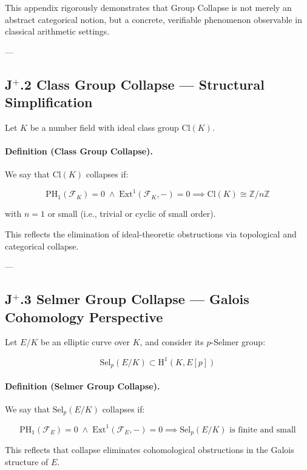 \documentclass[11pt]{article}
\begin{document}
This appendix rigorously demonstrates that Group Collapse is not merely an abstract categorical notion, but a concrete, verifiable phenomenon observable in classical arithmetic settings.

---

\subsection*{J$^{+}$.2 Class Group Collapse — Structural Simplification}

Let $K$ be a number field with ideal class group $\mathrm{Cl}(K)$.

\paragraph{Definition (Class Group Collapse).}

We say that $\mathrm{Cl}(K)$ collapses if:

\[
\mathrm{PH}_1(\mathcal{F}_K) = 0 \;\land\; \mathrm{Ext}^1(\mathcal{F}_K, -) = 0 \implies \mathrm{Cl}(K) \cong \mathbb{Z}/n\mathbb{Z}
\]

with $n = 1$ or small (i.e., trivial or cyclic of small order).

This reflects the elimination of ideal-theoretic obstructions via topological and categorical collapse.

---

\subsection*{J$^{+}$.3 Selmer Group Collapse — Galois Cohomology Perspective}

Let $E/K$ be an elliptic curve over $K$, and consider its $p$-Selmer group:

\[
\mathrm{Sel}_p(E/K) \subset \mathrm{H}^1(K, E[p])
\]

\paragraph{Definition (Selmer Group Collapse).}

We say that $\mathrm{Sel}_p(E/K)$ collapses if:

\[
\mathrm{PH}_1(\mathcal{F}_E) = 0 \;\land\; \mathrm{Ext}^1(\mathcal{F}_E, -) = 0 \implies \mathrm{Sel}_p(E/K) \text{ is finite and small}
\]

This reflects that collapse eliminates cohomological obstructions in the Galois structure of $E$.
\end{document}
